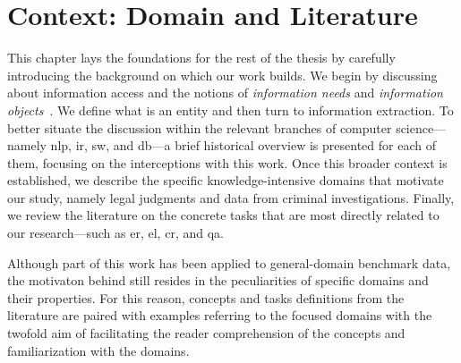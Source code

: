 \chapter{Context: Domain and Literature}




This chapter lays the foundations for the rest of the thesis by carefully introducing the background on which our work builds. We begin by discussing about information access and the notions of \emph{information needs} and \emph{information objects}~\cite{entityorientedsearch2018}. We define what is an entity and then turn to information extraction. To better situate the discussion within the relevant branches of computer science---namely \acl{nlp}, \acl{ir}, \acl{sw}, and \acl{db}---a brief historical overview is presented for each of them, focusing on the interceptions with this work. Once this broader context is established, we describe the specific knowledge-intensive domains that motivate our study, namely legal judgments and data from criminal investigations. Finally, we review the literature on the concrete tasks that are most directly related to our research---such as \acl{er}, \acl{el}, \acl{cr}, and \acl{qa}.

Although part of this \phd work has been applied to general-domain benchmark data, the motivaton behind still resides in the peculiarities of specific domains and their properties.
For this reason, concepts and tasks definitions from the literature are paired with examples referring to the focused domains with the twofold aim of facilitating the reader comprehension of the concepts and familiarization with the domains.  


